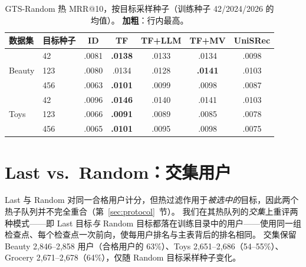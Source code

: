 \documentclass[sigconf,natbib=true,anonymous]{acmart}
\begin{document}
\begin{table}[H]
\centering
\caption{GTS-Random 热 MRR@10，按目标采样种子（训练种子 42/2024/2026 的均值）。
\textbf{加粗}：行内最高。}
\label{tab:random-seeds}
\small
\setlength{\tabcolsep}{3pt}
\begin{tabular}{@{}llccccc@{}}
\toprule
数据集 & 目标种子 & ID & TF & TF+LLM & TF+MV & UniSRec \\
\midrule
\multirow{3}{*}{Beauty}
 & 42    & .0081 & \textbf{.0138} & .0133 & .0134 & .0098 \\
 & 123   & .0080 & .0134 & .0128 & \textbf{.0141} & .0103 \\
 & 456   & .0063 & \textbf{.0101} & .0099 & .0098 & .0087 \\
\midrule
\multirow{3}{*}{Toys}
 & 42    & .0096 & \textbf{.0146} & .0140 & .0141 & .0103 \\
 & 123   & .0066 & \textbf{.0091} & .0089 & .0085 & .0078 \\
 & 456   & .0065 & \textbf{.0101} & .0095 & .0098 & .0075 \\
\bottomrule
\end{tabular}
\end{table}

\section{Last vs.\ Random：交集用户}
\label{app:intersection}

Last 与 Random 对同一合格用户计分，但热过滤作用于\emph{被选中的}目标，因此两个热子队列并不完全重合（第~\ref{sec:protocol}~节）。
我们在其热队列的\emph{交集}上重评两种模式——即 Last 目标\emph{与} Random 目标都落在训练目录中的用户——使用同一组检查点、每个检查点一次前向，使每用户排名与主表背后的排名相同。
交集保留 Beauty 2{,}846--2{,}858 用户（合格用户的 63\%）、Toys 2{,}651--2{,}686（54--55\%）、Grocery 2{,}671--2{,}678（64\%），仅随 Random 目标采样种子变化。
\end{document}
